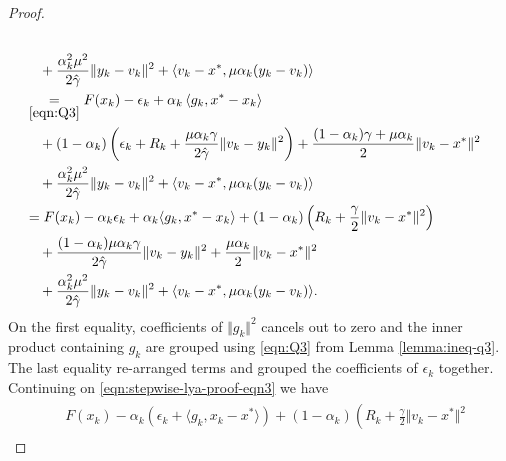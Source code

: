 \documentclass[12pt]{article}
\begin{document}
\begin{proof}
\begin{align}
\begin{split}
            \\
            & \quad 
                + \frac{\alpha_k^2 \mu^2}{2\hat \gamma}\Vert y_k - v_k\Vert^2
                + \langle v_k - x^*, \mu\alpha_k(y_k - v_k)\rangle
            \\
            &\underset{\eqref{eqn:Q3}}{=} 
            F(x_k) - \epsilon_k 
            + \alpha_k\left\langle 
                g_k, 
                x^* - x_k
            \right\rangle
            \\
            &\quad 
                + (1 - \alpha_k)
                \left(
                    \epsilon_k + R_k + 
                    \frac{\mu\alpha_k\gamma}{2\hat \gamma}
                    \Vert v_k - y_k\Vert^2
                \right)
                + 
                \frac{(1 - \alpha_k)\gamma + \mu \alpha_k}{2} 
                \Vert v_k - x^*\Vert^2
            \\
            & \quad 
                + \frac{\alpha_k^2 \mu^2}{2\hat \gamma}\Vert y_k - v_k\Vert^2
                + \langle v_k - x^*, \mu\alpha_k(y_k - v_k)\rangle
            \\
            &= 
            F(x_k) - \alpha_k\epsilon_k + \alpha_k\langle g_k, x^* - x_k\rangle
            + 
            (1 - \alpha_k)\left(
                R_k + \frac{\gamma}{2}\Vert v_k - x^*\Vert^2
            \right)
            \\&\quad 
                + \frac{(1 - \alpha_k)\mu\alpha_k\gamma}{2\hat \gamma}\Vert v_k - y_k\Vert^2
                + \frac{\mu \alpha_k}{2}\Vert v_k - x^*\Vert^2
            \\&\quad 
                + \frac{\alpha_k^2 \mu^2}{2\hat\gamma}\Vert y_k - v_k\Vert^2
                + \langle v_k - x^*, \mu\alpha_k(y_k - v_k)\rangle.     
        \end{split}
        \end{align}
        On the first equality, coefficients of $\Vert g_k\Vert^2$ cancels out to zero and the inner product containing $g_k$ are grouped
        using \eqref{eqn:Q3} from Lemma \ref{lemma:ineq-q3}. 
        The last equality re-arranged terms and grouped the coefficients of $\epsilon_k$ together. 
        Continuing on \eqref{eqn:stepwise-lya-proof-eqn3} we have
        \begin{align}\label{eqn:stepwise-lya-proof-eqn3.1}
        \begin{split}
            &
            F(x_k) - \alpha_k(\epsilon_k + \langle g_k, x_k - x^*\rangle)
            + 
            (1 - \alpha_k)\left(
                R_k + \frac{\gamma}{2}\Vert v_k - x^*\Vert^2

\end{split}
\end{align}
\end{proof}
\end{document}
